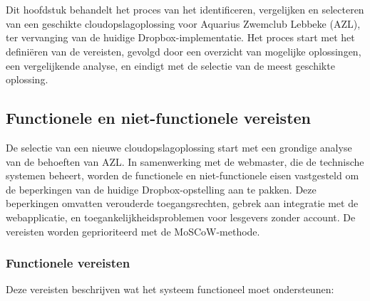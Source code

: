\chapter{}
\label{ch:vergelijking}
Dit hoofdstuk behandelt het proces van het identificeren, vergelijken en selecteren van een geschikte 
cloudopslagoplossing voor Aquarius Zwemclub Lebbeke (AZL), ter vervanging van de huidige Dropbox-implementatie. 
Het proces start met het definiëren van de vereisten, gevolgd door een overzicht van mogelijke oplossingen, 
een vergelijkende analyse, en eindigt met de selectie van de meest geschikte oplossing.

\section{Functionele en niet-functionele vereisten}
De selectie van een nieuwe cloudopslagoplossing start met een grondige analyse van de behoeften van AZL. 
In samenwerking met de webmaster, die de technische systemen beheert, worden de functionele en niet-functionele 
eisen vastgesteld om de beperkingen van de huidige Dropbox-opstelling aan te pakken. 
Deze beperkingen omvatten verouderde toegangsrechten, gebrek aan integratie met de webapplicatie, 
en toegankelijkheidsproblemen voor lesgevers zonder account. De vereisten worden geprioriteerd met de MoSCoW-methode.

\subsection{Functionele vereisten}
Deze vereisten beschrijven wat het systeem functioneel moet ondersteunen:

